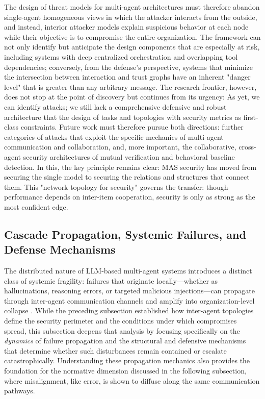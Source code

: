 \documentclass[11pt,a4paper]{article}
\begin{document}
The design of threat models for multi-agent architectures must therefore abandon single-agent homogeneous views in which the attacker interacts from the outside, and instead, interior attacker models explain suspicious behavior at each node while their objective is to compromise the entire organization. The framework can not only identify but anticipate the design components that are especially at risk, including systems with deep centralized orchestration and overlapping tool dependencies; conversely, from the defense's perspective, systems that minimize the intersection between interaction and trust graphs have an inherent "danger level" that is greater than any arbitrary message. The research frontier, however, does not stop at the point of discovery but continues from its urgency: As yet, we can identify attacks; we still lack a comprehensive defensive and robust architecture that the design of tasks and topologies with security metrics as first-class constraints. Future work must therefore pursue both directions: further categories of attacks that exploit the specific mechanics of multi-agent communication and collaboration, and, more important, the collaborative, cross-agent security architectures of mutual verification and behavioral baseline detection. In this, the key principle remains clear: MAS security has moved from securing the single model to securing the relations and structures that connect them. This "network topology for security" governs the transfer: though performance depends on inter-item cooperation, security is only as strong as the most confident edge.


\subsection{Cascade Propagation, Systemic Failures, and Defense Mechanisms}


The distributed nature of LLM-based multi-agent systems introduces a distinct class of systemic fragility: failures that originate locally---whether as hallucinations, reasoning errors, or targeted malicious injections---can propagate through inter-agent communication channels and amplify into organization-level collapse \cite{arxiv:2509.18970v2,arxiv:2506.08292v1}. While the preceding subsection established how inter-agent topologies define the security perimeter and the conditions under which compromises spread, this subsection deepens that analysis by focusing specifically on the \emph{dynamics} of failure propagation and the structural and defensive mechanisms that determine whether such disturbances remain contained or escalate catastrophically. Understanding these propagation mechanics also provides the foundation for the normative dimension discussed in the following subsection, where misalignment, like error, is shown to diffuse along the same communication pathways.
\end{document}
